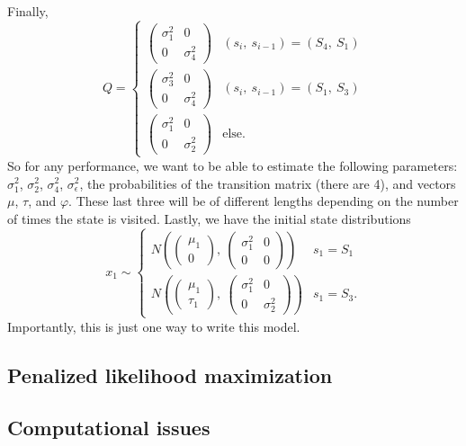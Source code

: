 \documentclass[12pt]{article}
\begin{document}
Finally, 
\[
Q=\begin{cases}\begin{pmatrix} \sigma^2_1 &
    0\\0&\sigma^2_4\end{pmatrix} & (s_i,\ s_{i-1})=(S_4,\ S_1)\\
                \begin{pmatrix} \sigma^2_3 &
                        0\\0&\sigma^2_4\end{pmatrix} & (s_i,\ s_{i-1})=(S_1,\ S_3)\\
\begin{pmatrix} \sigma^2_1 &
    0\\0&\sigma^2_2\end{pmatrix} & \textrm{else}.
\end{cases}
\] 
So for any performance, we want to be able to estimate
the following parameters: $\sigma_1^2$, $\sigma_2^2$, $\sigma^2_4$,
$\sigma_\epsilon^2$, the probabilities of the transition matrix (there
are 4), and vectors $\mu$, $\tau$, and $\varphi$. These last three
will be of different lengths depending on the number of times the
state is visited. Lastly, we have the initial state distributions
\[
x_1\sim\begin{cases} N\left( \begin{pmatrix}\mu_1\\0\end{pmatrix}
  ,\ \begin{pmatrix} \sigma^2_1 & 0\\0 & 0
  \end{pmatrix}\right) & s_1=S_1\\
N\left( \begin{pmatrix}\mu_1\\\tau_1\end{pmatrix}
  ,\ \begin{pmatrix} \sigma^2_1 & 0\\0 & \sigma^2_2
  \end{pmatrix}\right) & s_1=S_3.\end{cases}
\]
Importantly, this is just one way to write this
model.

\subsection{Penalized likelihood maximization}
\label{sec:penal-likel-maxim}

\subsection{Computational issues}
\label{sec:computational-issues}
\end{document}
